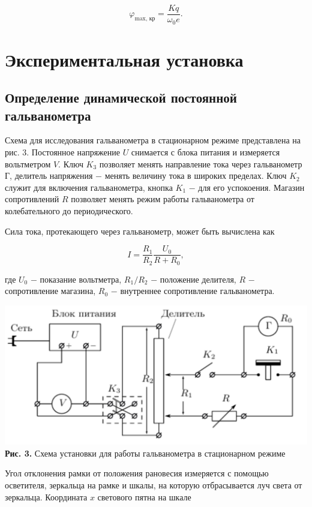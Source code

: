 \documentclass[a4paper,12pt]{article} %
\begin{document}
\begin{equation}\label{ linkname }
\varphi_\text{max, кр} = \frac{Kq}{\omega_{0}e}.
\end{equation}

\section{Экспериментальная установка}
\subsection{Определение динамической постоянной гальванометра}
\hfill \break Схема для исследования гальванометра в стационарном режиме представлена на рис. 3. Постоянное напряжение $U$ снимается с блока питания и измеряется вольтметром $V$. Ключ $K_{3}$ позволяет менять направление тока через гальванометр Г, делитель напряжения $-$ менять величину тока в широких пределах. Ключ $K_{2}$ служит для включения гальванометра, кнопка $K_{1}$ $-$ для его успокоения. Магазин сопротивлений $R$ позволяет менять режим работы гальванометра от колебательного до периодического.

\hfill \break Сила тока, протекающего через гальванометр, может быть вычислена как

\begin{equation}\label{ linkname }
I = \frac{R_{1}}{R_{2}} \frac{U_{0}}{R + R_{0}},
\end{equation}

\hfill \break где $U_{0}$ $-$ показание вольтметра, $R_{1}/R_{2}$ $-$ положение делителя, $R$ $-$ сопротивление магазина, $R_{0}$ $-$ внутреннее сопротивление гальванометра. 

\begin{center}
\includegraphics[width=0.65\linewidth]{3.2.6_3.png}\\
\textbf{Рис. 3.} Схема установки для работы гальванометра в стационарном режиме\\
\end{center}

\hfill \break Угол отклонения рамки от положения рановесия измеряется с помощью осветителя, зеркальца на рамке и шкалы, на которую отбрасывается луч света от зеркальца. Координата $x$ светового пятна на шкале
\end{document}
